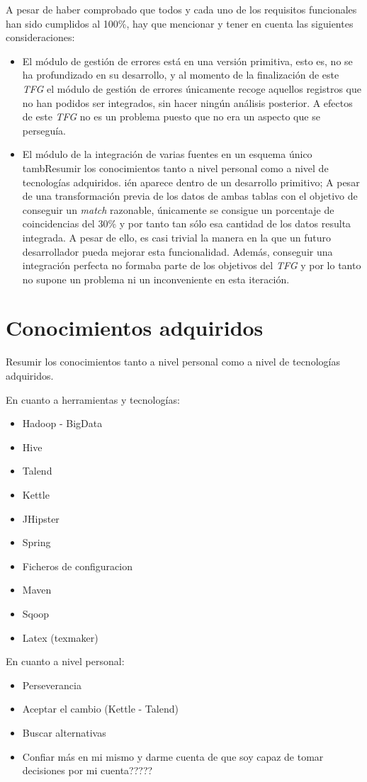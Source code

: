  A pesar de haber comprobado que todos y cada uno de los requisitos funcionales han sido cumplidos al 100\%, hay que mencionar y tener en cuenta las siguientes consideraciones:
\begin{itemize}
\item El módulo de gestión de errores está en una versión primitiva, esto es, no se ha profundizado en su desarrollo, y al momento de la finalización de este \textit{TFG} el módulo de gestión de errores únicamente recoge aquellos registros que no han podidos ser integrados, sin hacer ningún análisis posterior. A efectos de este \textit{TFG} no es un problema puesto que no era un aspecto que se perseguía. 
\item El módulo de la integración de varias fuentes en un esquema único tambResumir los conocimientos tanto a nivel personal como a nivel de tecnologías adquiridos.
ién aparece dentro de un desarrollo primitivo; A pesar de una transformación previa de los datos de ambas tablas con el objetivo de conseguir un \textit{match} razonable, únicamente se consigue un porcentaje de coincidencias del 30\% y por tanto tan sólo esa cantidad de los datos resulta integrada. A pesar de ello, es casi trivial la manera en la que un futuro desarrollador pueda mejorar esta funcionalidad. Además, conseguir una integración perfecta no formaba parte de los objetivos del \textit{TFG} y por lo tanto no supone un problema ni un inconveniente en esta iteración.
\end{itemize}

\section{Conocimientos adquiridos} \label{conclusiones.conocimientos}
Resumir los conocimientos tanto a nivel personal como a nivel de tecnologías adquiridos.

En cuanto a herramientas y tecnologías: 
\begin{itemize}
 \item Hadoop - BigData
 \item Hive
 \item Talend
 \item Kettle
 \item JHipster
 \item Spring
 \item Ficheros de configuracion
 \item Maven
 \item Sqoop
 \item Latex (texmaker)
 \end{itemize} 

En cuanto a nivel personal:
\begin{itemize}
 \item Perseverancia
 \item Aceptar el cambio (Kettle - Talend) 
 \item Buscar alternativas
 \item Confiar más en mi mismo y darme cuenta de que soy capaz de tomar decisiones por mi cuenta?????
 \end{itemize} 
 
